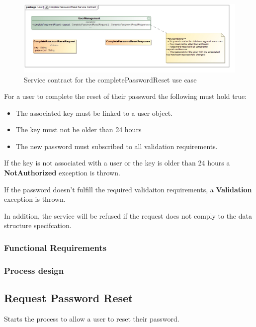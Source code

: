 \begin{figure}[H]
  \begin{center}
  \includegraphics[scale=0.55]{../Diagrams and Charts/Users/Complete Password Reset Service Contract.jpg}
  \caption{Service contract for the completePasswordReset use case}
  \end{center}
  \label{fig:completePasswordResetServicesContract}
\end{figure}

For a user to complete the reset of their password the following must hold true:
\begin{itemize}
	\item The associated key must be linked to a user object.
	\item The key must not be older than 24 hours
	\item The new password must subscribed to all validation requirements.
\end{itemize}

If the key is not associated with a user or the key is older than 24 hours a \textbf{NotAuthorized} exception is thrown.

If the password doesn't fulfill the required validaiton requirements, a \textbf{Validation} exception is thrown.

In addition, the service will be refused if the request does not comply to the data structure specifcation.

\subsubsection{Functional Requirements}

\subsubsection{Process design}

\subsection{Request Password Reset}
Starts the process to allow a user to reset their password.

